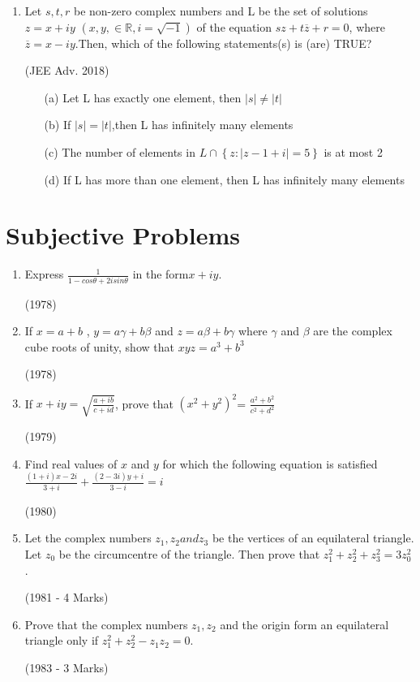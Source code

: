 \documentclass[journal,12pt,twocolumn]{IEEEtran}
\theoremstyle{remark}
\begin{document}
\begin{enumerate}
    \item Let \( s, t, r\) be non-zero complex numbers and L be the set of solutions \( z = x + iy \) \(\left(x,y, \in \mathbb{R},i=\sqrt{-1}\right)\) of the equation \(sz + t\overline{z} + r = 0\), where \( \overline{z}=x-iy\).Then, which of the following statements(s) is (are) TRUE?

    \hfill (JEE Adv. 2018)

    \begin{itemize}
    \item[(a)] Let L has exactly one element, then \(|s| \ne |t|\)
    \item[(b)] If \(|s| = |t|\),then L has infinitely many elements 
    \item[(c)] The number of elements in \(L \cap \left\{z:|z-1+i|=5\right\}\) is at most 2
    \item[(d)] If L has more than one element, then L has infinitely many elements 
    \end{itemize}

    \end{enumerate}

    \section{Subjective Problems}

    \begin{enumerate}
    
    \item Express \(\frac{1}{1-cos\theta +2isin\theta}\) in the form\(x + iy\).

    \hfill (1978)

    \item If \(x = a + b\) , \(y = a\gamma + b\beta\) and \(z = a\beta + b\gamma\) where \(\gamma\) and \(\beta\) are the complex cube roots of unity, show that \(xyz = a^3 + b^3\)

    \hfill (1978)

    \item If \(x + iy =\sqrt{\frac{a + ib}{c + id}}\), prove that \(\left(x^2 + y^2\right)^2\)= \(\frac{a^2 + b^2}{c^2 + d^2}\)

    \hfill (1979)

    \item Find real values of \(x\) and \(y\) for which the following equation is satisfied \(\frac{\left(1 + i\right)x - 2i}{3 + i} + \frac{\left(2 - 3i\right)y + i}{3 - i} = i\)

    \hfill (1980)

    \item Let the complex numbers \(z_1 , z_2 and z_3\) be the vertices of an equilateral triangle. Let \(z_0\) be the circumcentre of the triangle. Then prove that \(z_1^2 + z_2^2 + z_3^2 = 3z_0^2 \).

    \hfill (1981 - 4 Marks)

    \item Prove that the complex numbers \(z_1,z_2\) and the origin form an equilateral triangle only if \(z_1^2 + z_2^2 - z_1z_2 = 0\).

    \hfill (1983 - 3 Marks)
    \end{enumerate} 
    
    
\end{document}
